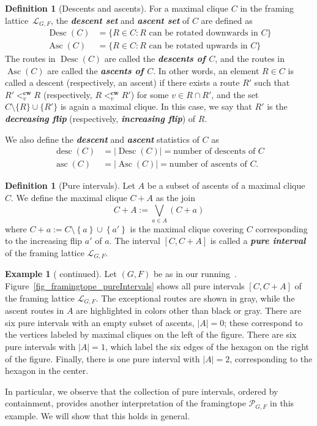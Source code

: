 \documentclass[12pt, reqno]{amsart}
\newcommand{\defn}[1]{{\color{blue!50!black}\textbf{\emph{#1}}}}
\newcommand{\set}[1]{\left\lbrace#1\right\rbrace}
\newcommand{\asc}{\operatorname{asc}}
\newcommand{\desc}{\operatorname{desc}}
\newcommand{\Asc}{\operatorname{Asc}}
\newcommand{\Desc}{\operatorname{Desc}}
\theoremstyle{plain}
\theoremstyle{definition}
\newtheorem{definition}[theorem]{Definition}
\newtheorem{example}[theorem]{Example}
\numberwithin{equation}{section}
\newcommand\scrL{\mathscr{L}}
\begin{document}
\begin{definition}[Descents and ascents]
    For a maximal clique $C$ in the framing lattice~$\scrL_{G,F}$, the \defn{descent set} and \defn{ascent set} of $C$ are defined as
    \begin{align*}
        \Desc(C) &= \{R\in C : R \text{ can be rotated downwards in } C \} \\
        \Asc(C) &= \{R\in C : R \text{ can be rotated upwards in } C \} 
    \end{align*}
    The routes in $\Desc(C)$ are called the \defn{descents of $C$}, and the routes in $\Asc(C)$ are called the \defn{ascents of $C$}. In other words, an element \(R \in C\) is called a descent (respectively, an ascent) if there exists a route \(R'\) such that \(R' <^{\textbf{cw}}_{v} R\) (respectively, \(R <^{\textbf{cw}}_{v} R'\)) for some \(v \in R \cap R'\), and the set \(C \setminus \{R\} \cup \{R'\}\) is again a maximal clique. In this case, we say that \(R'\) is the \defn{decreasing flip} (respectively, \defn{increasing flip}) of \(R\).
    
    We also define the \defn{descent} and \defn{ascent} statistics of $C$ as
    \begin{align*}
        \desc(C) &=|\Desc(C)|= \text{number of descents of } C \\
        \asc(C) &=|\Asc(C)|= \text{number of ascents of } C. 
    \end{align*}
\end{definition}


\begin{definition}[Pure intervals]
    Let $A$ be a subset of ascents of a maximal clique $C$. We define the maximal clique $C+A$ as the join
    \[C+A:=\bigvee_{a\in A}(C+a)\] 
    where $C+a:=C\setminus\set{a}\cup\set{a'}$ is the maximal clique covering $C$ corresponding to the increasing flip $a'$ of $a$. The interval $[C,C+A]$ is called a \defn{pure interval} of the framing lattice $\mathscr{L}_{G,F}$.
\end{definition}

\begin{example}[ continued]
    Let $(G,F)$ be as in our running~. Figure~\ref{fig_framingtope_pureIntervals} shows all pure intervals $[C, C + A]$ of the framing lattice $\mathscr{L}_{G,F}$. The exceptional routes are shown in gray, while the ascent routes in $A$ are highlighted in colors other than black or gray. There are six pure intervals with an empty subset of ascents, $|A| = 0$; these correspond to the vertices labeled by maximal cliques on the left of the figure. There are six pure intervals with $|A| = 1$, which label the six edges of the hexagon on the right of the figure. Finally, there is one pure interval with $|A| = 2$, corresponding to the hexagon in the center.

    In particular, we observe that the collection of pure intervals, ordered by containment, provides another interpretation of the framingtope $\mathscr{P}_{G,F}$ in this example. We will show that this holds in general.
\end{example}
\end{document}
